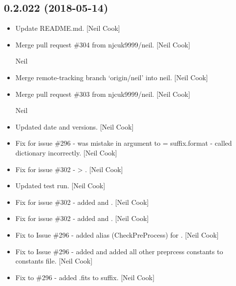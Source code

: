 \documentclass[a4paper,10pt,english]{report}
\begin{document}
\subsection{0.2.022 (2018-05-14)}
\label{\detokenize{misc/changelog:id438}}\begin{itemize}
\item {} 
Update README.md. {[}Neil Cook{]}

\item {} 
Merge pull request \#304 from njcuk9999/neil. {[}Neil Cook{]}

Neil

\item {} 
Merge remote-tracking branch ‘origin/neil’ into neil. {[}Neil Cook{]}

\item {} 
Merge pull request \#303 from njcuk9999/neil. {[}Neil Cook{]}

Neil

\item {} 
Updated date and versions. {[}Neil Cook{]}

\item {} 
Fix for issue \#296 - was mistake in argument to  =
suffix.format  - called dictionary incorrectly. {[}Neil Cook{]}

\item {} 
Fix for issue \#302 -  \textendash{}\textgreater{} . {[}Neil Cook{]}

\item {} 
Updated test run. {[}Neil Cook{]}

\item {} 
Fix for issue \#302 - added  and . {[}Neil
Cook{]}

\item {} 
Fix for issue \#302 - added  and . {[}Neil
Cook{]}

\item {} 
Fix to Issue \#296 - added alias (CheckPreProcess) for
. {[}Neil Cook{]}

\item {} 
Fix to Issue \#296 - added  and added all other
preprcess constants to constants file. {[}Neil Cook{]}

\item {} 
Fix to \#296 - added .fits to suffix. {[}Neil Cook{]}


\end{itemize}
\end{document}
